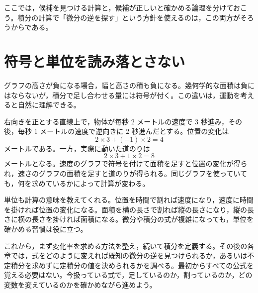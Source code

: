 ここでは，候補を見つける計算と，候補が正しいと確かめる論理を分けておこう。積分の計算で「微分の逆を探す」という方針を使えるのは，この両方がそろうからである。

\section{符号と単位を読み落とさない}
グラフの高さが負になる場合，幅と高さの積も負になる。幾何学的な面積は負にはならないが，積分で足し合わせる量には符号が付く。この違いは，運動を考えると自然に理解できる。

右向きを正とする直線上で，物体が毎秒 $2$ メートルの速度で $3$ 秒進み，その後，毎秒 $1$ メートルの速度で逆向きに $2$ 秒進んだとする。位置の変化は
\[
 2\times3+(-1)\times2=4
\]
メートルである。一方，実際に動いた道のりは
\[
 2\times3+1\times2=8
\]
メートルとなる。速度のグラフで符号を付けて面積を足すと位置の変化が得られ，速さのグラフの面積を足すと道のりが得られる。同じグラフを使っていても，何を求めているかによって計算が変わる。

単位も計算の意味を教えてくれる。位置を時間で割れば速度になり，速度に時間を掛ければ位置の変化になる。面積を横の長さで割れば縦の長さになり，縦の長さに横の長さを掛ければ面積になる。微分や積分の式が複雑になっても，単位を確かめる習慣は役に立つ。

これから，まず変化率を求める方法を整え，続いて積分を定義する。その後の各章では，式をどのように変えれば既知の微分の逆を見つけられるか，あるいは不定積分を求めずに定積分の値を決められるかを調べる。最初からすべての公式を覚える必要はない。今扱っている式で，足しているのか，割っているのか，どの変数を変えているのかを確かめながら進めよう。

